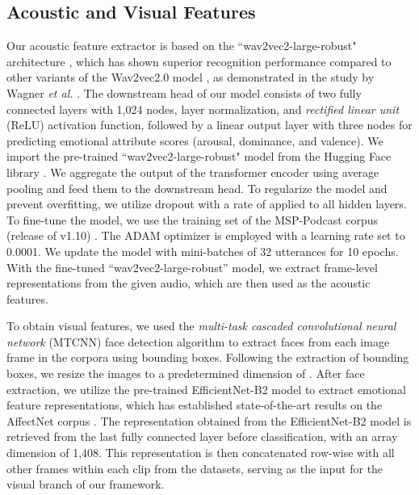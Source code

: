 \documentclass{article}
\def \etal {\textit{et al. }}
\begin{document}
\subsection{Acoustic and Visual Features}
\label{sec:features}

Our acoustic feature extractor is based on the ``wav2vec2-large-robust" architecture \cite{Hsu_2021_2}, which has shown superior recognition performance compared to other variants of the Wav2vec2.0 model \cite{Baevski_2020}, as demonstrated in the study by Wagner \etal \cite{Wagner_2022}. The downstream head of our model consists of two fully connected layers with 1,024 nodes, layer normalization, and \emph{rectified linear unit} (ReLU) activation function, followed by a linear output layer with three nodes for predicting emotional attribute scores (arousal, dominance, and valence). We import the pre-trained ``wav2vec2-large-robust" model from the Hugging Face library \cite{Wolf_2019}. We aggregate the output of the transformer encoder using average pooling and feed them to the downstream head. To regularize the model and prevent overfitting, we utilize dropout with a rate of  applied to all hidden layers. To fine-tune the model, we use the training set of the MSP-Podcast corpus (release of v1.10) \cite{Lotfian_2019_3}. The ADAM optimizer \cite{Kingma_2014_2} is employed with a learning rate set to 0.0001. We update the model with mini-batches of 32 utterances for 10 epochs. With the fine-tuned ``wav2vec2-large-robust” model, we extract frame-level representations from the given audio, which are then used as the acoustic features.

To obtain visual features, we used the \emph{multi-task cascaded convolutional neural network} (MTCNN) face detection algorithm \cite{Zhang_2016_8} to extract faces from each image frame in the corpora using bounding boxes. Following the extraction of bounding boxes, we resize the images to a predetermined dimension of . After face extraction, we utilize the pre-trained EfficientNet-B2 model \cite{savchenko_2022} to extract emotional feature representations, which has established state-of-the-art results on the AffectNet corpus \cite{Mollahosseini_2019}. The representation obtained from the EfficientNet-B2 model is retrieved from the last fully connected layer before classification, with an array dimension of 1,408. This representation is then concatenated row-wise with all other frames within each clip from the datasets, serving as the input for the visual branch of our framework.
\end{document}
